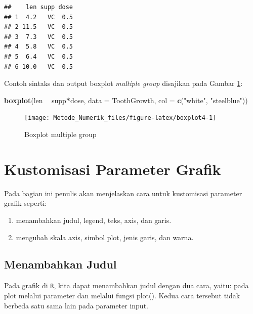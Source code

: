\documentclass[]{book}
\newenvironment{Shaded}{\begin{snugshade}}{\end{snugshade}}
\newcommand{\DataTypeTok}[1]{\textcolor[rgb]{0.13,0.29,0.53}{#1}}
\newcommand{\KeywordTok}[1]{\textcolor[rgb]{0.13,0.29,0.53}{\textbf{#1}}}
\newcommand{\NormalTok}[1]{#1}
\newcommand{\OperatorTok}[1]{\textcolor[rgb]{0.81,0.36,0.00}{\textbf{#1}}}
\newcommand{\StringTok}[1]{\textcolor[rgb]{0.31,0.60,0.02}{#1}}
\providecommand{\tightlist}{%
  \setlength{\itemsep}{0pt}\setlength{\parskip}{0pt}}
\theoremstyle{definition}
\theoremstyle{definition}
\theoremstyle{definition}
\theoremstyle{remark}
\begin{document}
\begin{verbatim}
##    len supp dose
## 1  4.2   VC  0.5
## 2 11.5   VC  0.5
## 3  7.3   VC  0.5
## 4  5.8   VC  0.5
## 5  6.4   VC  0.5
## 6 10.0   VC  0.5
\end{verbatim}

Contoh sintaks dan output boxplot \emph{multiple group} disajikan pada Gambar \ref{fig:boxplot4}:

\begin{Shaded}
\begin{Highlighting}[]
\KeywordTok{boxplot}\NormalTok{(len }\OperatorTok{~}\StringTok{ }\NormalTok{supp}\OperatorTok{*}\NormalTok{dose, }\DataTypeTok{data =}\NormalTok{ ToothGrowth,}
        \DataTypeTok{col =} \KeywordTok{c}\NormalTok{(}\StringTok{"white"}\NormalTok{, }\StringTok{"steelblue"}\NormalTok{))}
\end{Highlighting}
\end{Shaded}

\begin{figure}

{\centering \texttt{[image: Metode\_Numerik\_files/figure-latex/boxplot4-1]} 

}

\caption{Boxplot multiple group}\label{fig:boxplot4}
\end{figure}

\hypertarget{customise}{%
\section{Kustomisasi Parameter Grafik}\label{customise}}

Pada bagian ini penulis akan menjelaskan cara untuk kustomisasi parameter grafik seperti:

\begin{enumerate}
\def\labelenumi{\alph{enumi}.}
\tightlist
\item
  menambahkan judul, legend, teks, axis, dan garis.
\item
  mengubah skala axis, simbol plot, jenis garis, dan warna.
\end{enumerate}

\hypertarget{addtitle}{%
\subsection{Menambahkan Judul}\label{addtitle}}

Pada grafik di \texttt{R}, kita dapat menambahkan judul dengan dua cara, yaitu: pada plot melalui parameter dan melalui fungsi plot(). Kedua cara tersebut tidak berbeda satu sama lain pada parameter input.
\end{document}
